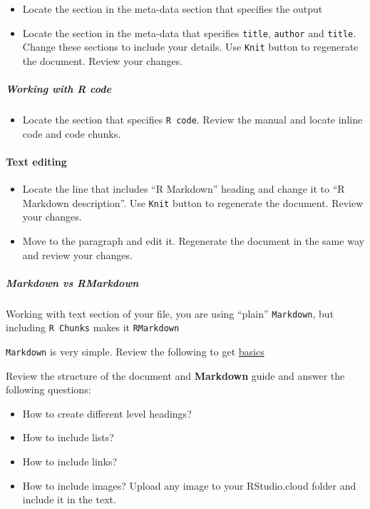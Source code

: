 \documentclass[
]{article}
\providecommand{\tightlist}{%
  \setlength{\itemsep}{0pt}\setlength{\parskip}{0pt}}
\begin{document}
\begin{itemize}
\item
  Locate the section in the meta-data section that specifies the output
\item
  Locate the section in the meta-data that specifies \texttt{title},
  \texttt{author} and \texttt{title}. Change these sections to include
  your details. Use \texttt{Knit} button to regenerate the document.
  Review your changes.
\end{itemize}

\hypertarget{working-with-r-code}{%
\subparagraph{Working with R code}\label{working-with-r-code}}

\begin{itemize}
\tightlist
\item
  Locate the section that specifies \texttt{R\ code}. Review the manual
  and locate inline code and code chunks.
\end{itemize}

\hypertarget{text-editing}{%
\paragraph{Text editing}\label{text-editing}}

\begin{itemize}
\item
  Locate the line that includes ``R Markdown'' heading and change it to
  ``R Markdown description''. Use \texttt{Knit} button to regenerate the
  document. Review your changes.
\item
  Move to the paragraph and edit it. Regenerate the document in the same
  way and review your changes.
\end{itemize}

\hypertarget{markdown-vs-rmarkdown}{%
\subparagraph{Markdown vs RMarkdown}\label{markdown-vs-rmarkdown}}

Working with text section of your file, you are using ``plain''
\texttt{Markdown}, but including \texttt{R\ Chunks} makes it
\texttt{RMarkdown}

\texttt{Markdown} is very simple. Review the following to get
\href{https://github.com/adam-p/markdown-here/wiki/Markdown-Cheatsheet}{basics}

Review the structure of the document and \textbf{Markdown} guide and
answer the following questions:

\begin{itemize}
\item
  How to create different level headings?
\item
  How to include lists?
\item
  How to include links?
\item
  How to include images? Upload any image to your RStudio.cloud folder
  and include it in the text.
\end{itemize}
\end{document}

